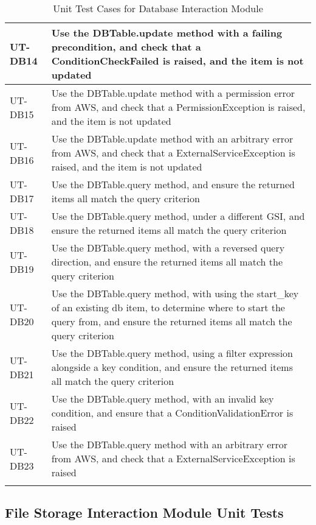 \documentclass[12pt, titlepage]{article}
\begin{document}
\begin{longtable}{|m{2cm}|m{10cm}|}
  UT-DB14 & Use the DBTable.update method with a failing
  precondition, and check that a ConditionCheckFailed is raised, and
  the item is not updated\\ \hline
  UT-DB15 & Use the DBTable.update method with a permission error
  from AWS, and check that a PermissionException is raised, and the
  item is not updated\\ \hline
  UT-DB16 & Use the DBTable.update method with an arbitrary error
  from AWS, and check that a ExternalServiceException is raised, and
  the item is not updated\\ \hline
  UT-DB17 & Use the DBTable.query method, and ensure the returned
  items all match the query criterion\\ \hline
  UT-DB18 & Use the DBTable.query method, under a different GSI, and
  ensure the returned items all match the query criterion\\ \hline
  UT-DB19 & Use the DBTable.query method, with a reversed query
  direction, and ensure the returned items all match the query
  criterion\\ \hline
  UT-DB20 & Use the DBTable.query method, with using the start\_key
  of an existing db item, to determine where to start the query from,
  and ensure the returned items all match the query criterion\\ \hline
  UT-DB21 & Use the DBTable.query method, using a filter expression
  alongside a key condition, and ensure the returned items all match
  the query criterion\\ \hline
  UT-DB22 & Use the DBTable.query method, with an invalid key
  condition, and ensure that a ConditionValidationError is raised\\ \hline
  UT-DB23 & Use the DBTable.query method with an arbitrary error
  from AWS, and check that a ExternalServiceException is raised\\ \hline
  \caption{Unit Test Cases for Database Interaction Module}
\end{longtable}

\subsection{File Storage Interaction Module Unit Tests}
\end{document}
